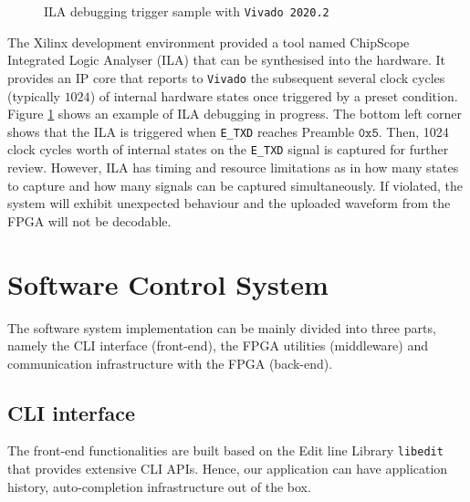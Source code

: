 \documentclass[a4paper]{report}
\newcommand{\code}{\texttt}
\begin{document}
\begin{figure}[h!]
  \caption{ILA debugging trigger sample with \code{Vivado 2020.2}}
  \label{fig:ila-debug-fpga}
\end{figure}

The Xilinx development environment provided a tool named ChipScope Integrated Logic Analyser (ILA) that can be synthesised into the hardware. It provides an IP core that reports to \code{Vivado} the subsequent several clock cycles (typically $1024$) of internal hardware states once triggered by a preset condition. Figure \ref{fig:ila-debug-fpga} shows an example of ILA debugging in progress. The bottom left corner shows that the ILA is triggered when \code{E\_TXD} reaches Preamble $\mathtt{0x5}$. Then, 1024 clock cycles worth of internal states on the \code{E\_TXD} signal is captured for further review. However, ILA has timing and resource limitations as in how many states to capture and how many signals can be captured simultaneously. If violated, the system will exhibit unexpected behaviour and the uploaded waveform from the FPGA will not be decodable.

\section{Software Control System}

The software system implementation can be mainly divided into three parts, namely the CLI interface (front-end), the FPGA utilities (middleware) and communication infrastructure with the FPGA (back-end).

\subsection{CLI interface}

The front-end functionalities are built based on the Edit line Library \code{libedit} that provides extensive CLI APIs. Hence, our application can have application history, auto-completion infrastructure out of the box.
\end{document}
